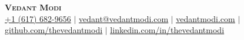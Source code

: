 \begin{center}
    \textbf{\Huge \scshape Vedant Modi} \\ 
    \vspace{1pt}
    \small \href{tel:+16176829656}{+1 (617) 682-9656} $|$ 
    \href{mailto:vedant@vedantmodi.com}{\underline{vedant@vedantmodi.com}} $|$ 
    \href{https://www.vedantmodi.com}{\underline{vedantmodi.com}} $|$
    \href{https://github.com/thevedantmodi}{\underline{github.com/thevedantmodi}} $|$
    \href{https://www.linkedin.com/in/thevedantmodi}{\underline{linkedin.com/in/thevedantmodi}}
    
\end{center}
